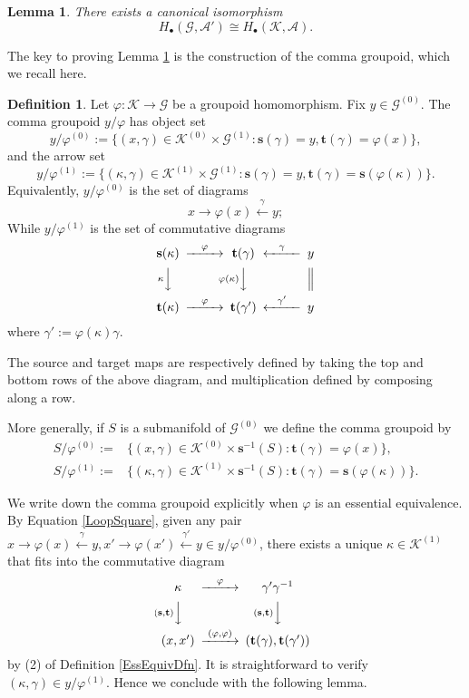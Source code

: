 \documentclass[a4paper]{amsart}
\newcommand{\maA}{\mathcal A}
\newcommand{\maG}{\mathcal G}
\newcommand{\maK}{\mathcal K}
\newcommand{\bs}{\mathbf{s}}
\newcommand{\bt}{\mathbf{t}}
\newcommand\<{\langle}
\renewcommand\>{\rangle}
\newtheorem{lem}[theorem]{Lemma}
\theoremstyle{definition}
\newtheorem{dfn}[theorem]{Definition}
\theoremstyle{remark}
\begin{document}
\begin{lem}
\label{HomMorita}
\cite[Theorem 4.4, Corollary 4.6]{Moerdijk;EtaleHomology}
There exists a canonical isomorphism
$$ H _\bullet (\maG , \maA') \cong H _\bullet (\maK, \maA) .$$
\end{lem}

The key to proving Lemma \ref{HomMorita} is the construction of the comma groupoid, which we recall here.

\begin{dfn}
Let $\varphi : \maK \to \maG$ be a groupoid homomorphism. Fix $y \in \maG ^{(0)}$.
The comma groupoid $y / \varphi $ has object set
$$ y / \varphi ^{(0)} := \{ (x, \gamma) \in \maK ^{(0)} \times \maG ^{(1)} : \bs (\gamma) = y, \bt (\gamma) = \varphi (x) \},$$
and the arrow set
$$ y / \varphi ^{(1)} := \{ (\kappa , \gamma ) \in \maK ^{(1)} \times \maG ^{(1)}
: \bs (\gamma) = y, \bt (\gamma ) = \bs (\varphi (\kappa)) \}.
$$
Equivalently, $y / \varphi ^{(0)}$ is the set of diagrams
$$ x \to \varphi (x) \xleftarrow{\gamma} y ;$$
While $y / \varphi ^{(1)}$ is the set of commutative diagrams
\begin{equation}
\begin{CD}
\bs (\kappa) @>{\varphi}>> \bt (\gamma) @<{\gamma}<< y \\
@V{\kappa}VV @V{\varphi (\kappa)}VV @| \\
\bt (\kappa) @>{\varphi}>> \bt (\gamma') @<{\gamma'}<< y \\
\end{CD}
\end{equation}
where $\gamma' :=  \varphi (\kappa) \gamma $.

The source and target maps are respectively defined by taking the top and bottom rows of the above diagram,
and multiplication defined by composing along a row.
\end{dfn}

More generally, if $S$ is a submanifold of $\maG ^{(0)}$ we define the comma groupoid by
\begin{align*}
S / \varphi ^{(0)} :=& \{ (x, \gamma) \in \maK ^{(0)} \times \bs^{-1} (S) : \bt (\gamma) = \varphi (x) \}, \\
S / \varphi ^{(1)} :=& \{ (\kappa , \gamma ) \in \maK ^{(1)} \times \bs^{-1} (S) : \bt (\gamma ) = \bs (\varphi (\kappa)) \}.
\end{align*}

We write down the comma groupoid explicitly when $\varphi$ is an essential equivalence.
By Equation \eqref{LoopSquare},
given any pair $ x \to \varphi (x) \xleftarrow{\gamma} y , x' \to \varphi (x') \xleftarrow{\gamma'} y \in y / \varphi ^{(0)}$,
there exists a unique $\kappa \in \maK ^{(1)}$ that fits into the commutative diagram
$$
\begin{CD}
\kappa @>{\varphi }>> \gamma' \gamma^{-1} \\
@V{(\bs , \bt)}VV @V{(\bs, \bt)}VV \\
(x, x') @>{(\varphi , \varphi )}>> (\bt (\gamma), \bt (\gamma'))
\end{CD}
$$
by (2) of Definition \ref{EssEquivDfn}.
It is straightforward to verify $(\kappa, \gamma) \in y / \varphi ^{(1)}$.
Hence we conclude with the following lemma.
\end{document}
